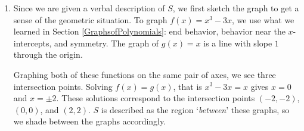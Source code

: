 \documentclass{ximera}
\begin{document}
\begin{example}
\begin{explanation}
\begin{enumerate}
\begin{enumerate}
\item  Since we are given a verbal description of $S$, we first sketch the graph to get a sense of the geometric situation.  To graph $f(x) = x^3-3x$, we use what we learned in Section \ref{GraphsofPolynomials}:  end behavior, behavior near the $x$-intercepts, and symmetry.  The graph of $g(x) = x$ is a line with slope $1$ through the origin.

Graphing both of these functions on the same pair of axes, we see three intersection points.  Solving $f(x) = g(x)$, that is $x^3-3x = x$ gives $x = 0$ and  $x = \pm 2$.  These solutions correspond to the intersection points $(-2,-2)$, $(0,0)$, and $(2,2)$.    $S$ is described as the region `\textit{between}' these graphs, so we shade between the graphs accordingly.

 \begin{image}
\end{image}
\end{enumerate}
\end{enumerate}
\end{explanation}
\end{example}
\end{document}
